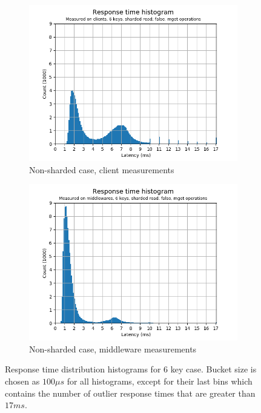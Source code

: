 \documentclass[11pt,a4paper]{article}
\begin{document}
\begin{figure}[h]
\begin{subfigure}{.5\textwidth}
  \centering
  \includegraphics[width=1.0\linewidth ,trim={0 0 0 0},clip]{img/plot/gmg-hist6-false-mget_clients.png}
  \caption{Non-sharded case, client measurements}
  \label{fig:gmg-hist6-false-mget_clients}
\end{subfigure}%
\begin{subfigure}{.5\textwidth}
  \centering
  \includegraphics[width=1.0\linewidth ,trim={0 0 0 0},clip]{img/plot/gmg-hist6-false-mget_middlewares.png}
  \caption{Non-sharded case, middleware measurements}
  \label{fig:gmg-hist6-false-mget_middlewares}
\end{subfigure}
\caption{Response time distribution histograms for 6 key case. Bucket size is chosen as $100\mu s$ for all histograms, except for their last bins which contains the number of outlier response times that are greater than $17ms$.}
\label{fig:gmg-hist6}
\end{figure}
\end{document}

